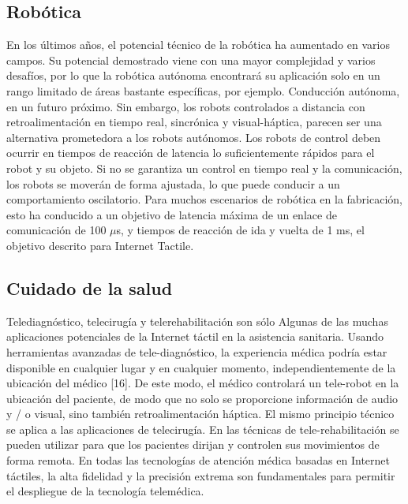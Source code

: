 \documentclass[12pt,journal,compsoc]{IEEEtran}
\begin{document}
\subsection{Robótica}

En los últimos años, el potencial técnico de la robótica ha aumentado en varios campos. Su potencial demostrado viene con una mayor complejidad y varios desafíos, por lo que la robótica autónoma encontrará su aplicación solo en un rango limitado de áreas bastante específicas, por ejemplo. Conducción autónoma, en un futuro próximo. Sin embargo, los robots controlados a distancia con retroalimentación en tiempo real, sincrónica y visual-háptica, parecen ser una alternativa prometedora a los robots autónomos. Los robots de control deben ocurrir en tiempos de reacción de latencia lo suficientemente rápidos para el robot y su objeto. Si no se garantiza un control en tiempo real y la comunicación, los robots se moverán de forma ajustada, lo que puede conducir a un comportamiento oscilatorio. Para muchos escenarios de robótica en la fabricación, esto ha conducido a un objetivo de latencia máxima de un enlace de comunicación de 100 \(\mu\)s, y tiempos de reacción de ida y vuelta de 1 ms, el objetivo descrito para Internet Tactile.

\subsection{Cuidado de la salud}

Telediagnóstico, telecirugía y telerehabilitación son sólo Algunas de las muchas aplicaciones potenciales de la Internet táctil en la asistencia sanitaria. Usando herramientas avanzadas de tele-diagnóstico, la experiencia médica podría estar disponible en cualquier lugar y en cualquier momento, independientemente de la ubicación del médico [16]. De este modo, el médico controlará un tele-robot en la ubicación del paciente, de modo que no solo se proporcione información de audio y / o visual, sino también retroalimentación háptica. El mismo principio técnico se aplica a las aplicaciones de telecirugía. En las técnicas de tele-rehabilitación se pueden utilizar para que los pacientes dirijan y controlen sus movimientos de forma remota. En todas las tecnologías de atención médica basadas en Internet táctiles, la alta fidelidad y la precisión extrema son fundamentales para permitir el despliegue de la tecnología telemédica.
\end{document}
